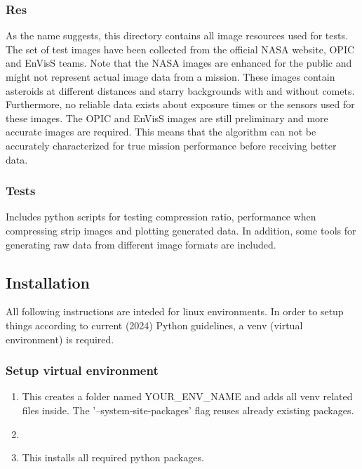 \documentclass[12pt, a4paper]{article}
\begin{document}
\noindent
\subsubsection{Res}
As the name suggests, this directory contains all image resources used for tests. 
The set of test images have been collected from the official NASA website, OPIC and EnVisS teams. 
Note that the NASA images are enhanced for the public and might not represent actual image data from a mission. 
These images contain asteroids at different distances and starry backgrounds with and without comets. 
Furthermore, no reliable data exists about exposure times or the sensors used for these images. 
The OPIC and EnVisS images are still preliminary and more accurate images are required. 
This means that the algorithm can not be accurately characterized for true mission performance before receiving better data. 

\noindent
\subsubsection{Tests}
Includes python scripts for testing compression ratio, 
performance when compressing strip images and plotting generated data. 
In addition, some tools for generating raw data from different image formats are included. 

\newpage
\subsection{Installation}
All following instructions are inteded for linux environments. 
In order to setup things according to current (2024) Python guidelines, 
a venv (virtual environment) is required.

\subsubsection{Setup virtual environment}
\begin{enumerate}

    \item {}

        \medskip
        This creates a folder named YOUR\_ENV\_NAME and adds all venv related files inside. 
        The '--system-site-packages' flag reuses already existing packages.

    \medskip
    \item {}

    \medskip
    \item {}

        \medskip
        This installs all required python packages.
\end{enumerate}
\end{document}
